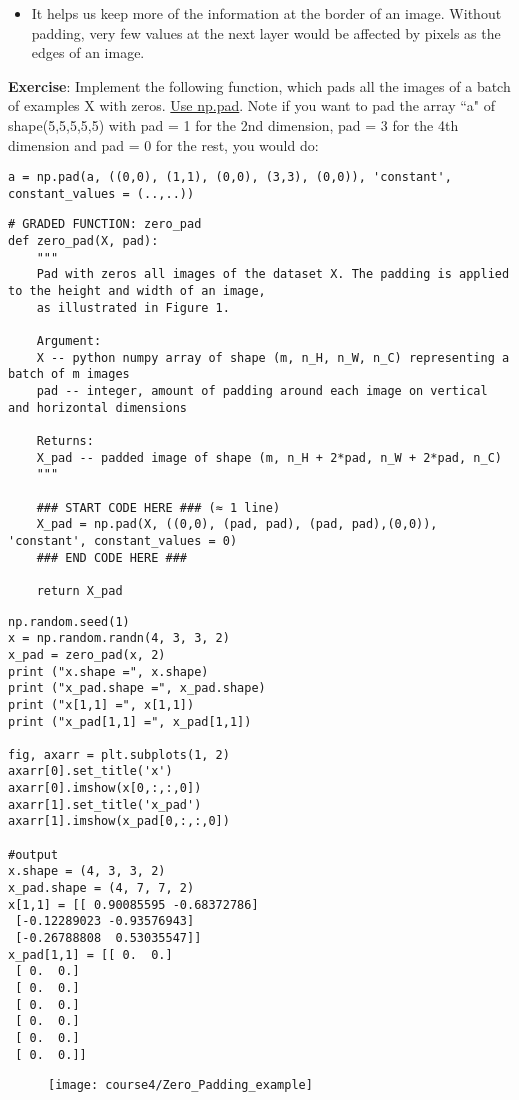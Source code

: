 {\begin{itemize}
\item It helps us keep more of the information at the border of an image. Without padding, very few values at the next layer would be affected by pixels as the edges of an image.
\end{itemize}
{\textbf {Exercise}}: Implement the following function, which pads all the images of a batch of examples X with zeros. \href{https://docs.scipy.org/doc/numpy/reference/generated/numpy.pad.html}{Use np.pad}. Note if you want to pad the array ``a" of shape(5,5,5,5,5)  with pad = 1 for the 2nd dimension, pad = 3 for the 4th dimension and pad = 0 for the rest, you would do:
\begin{verbatim}
a = np.pad(a, ((0,0), (1,1), (0,0), (3,3), (0,0)), 'constant', constant_values = (..,..))
\end{verbatim}

\begin{verbatim}
# GRADED FUNCTION: zero_pad
def zero_pad(X, pad):
    """
    Pad with zeros all images of the dataset X. The padding is applied to the height and width of an image, 
    as illustrated in Figure 1.
    
    Argument:
    X -- python numpy array of shape (m, n_H, n_W, n_C) representing a batch of m images
    pad -- integer, amount of padding around each image on vertical and horizontal dimensions
    
    Returns:
    X_pad -- padded image of shape (m, n_H + 2*pad, n_W + 2*pad, n_C)
    """
    
    ### START CODE HERE ### (≈ 1 line)
    X_pad = np.pad(X, ((0,0), (pad, pad), (pad, pad),(0,0)), 'constant', constant_values = 0)
    ### END CODE HERE ###
    
    return X_pad
\end{verbatim}

\begin{verbatim}
np.random.seed(1)
x = np.random.randn(4, 3, 3, 2)
x_pad = zero_pad(x, 2)
print ("x.shape =", x.shape)
print ("x_pad.shape =", x_pad.shape)
print ("x[1,1] =", x[1,1])
print ("x_pad[1,1] =", x_pad[1,1])

fig, axarr = plt.subplots(1, 2)
axarr[0].set_title('x')
axarr[0].imshow(x[0,:,:,0])
axarr[1].set_title('x_pad')
axarr[1].imshow(x_pad[0,:,:,0])

#output
x.shape = (4, 3, 3, 2)
x_pad.shape = (4, 7, 7, 2)
x[1,1] = [[ 0.90085595 -0.68372786]
 [-0.12289023 -0.93576943]
 [-0.26788808  0.53035547]]
x_pad[1,1] = [[ 0.  0.]
 [ 0.  0.]
 [ 0.  0.]
 [ 0.  0.]
 [ 0.  0.]
 [ 0.  0.]
 [ 0.  0.]]
\end{verbatim}
\begin{figure}[h]
\begin{center}
\texttt{[image: course4/Zero\_Padding\_example]}
\end{center}
\end{figure}



}

